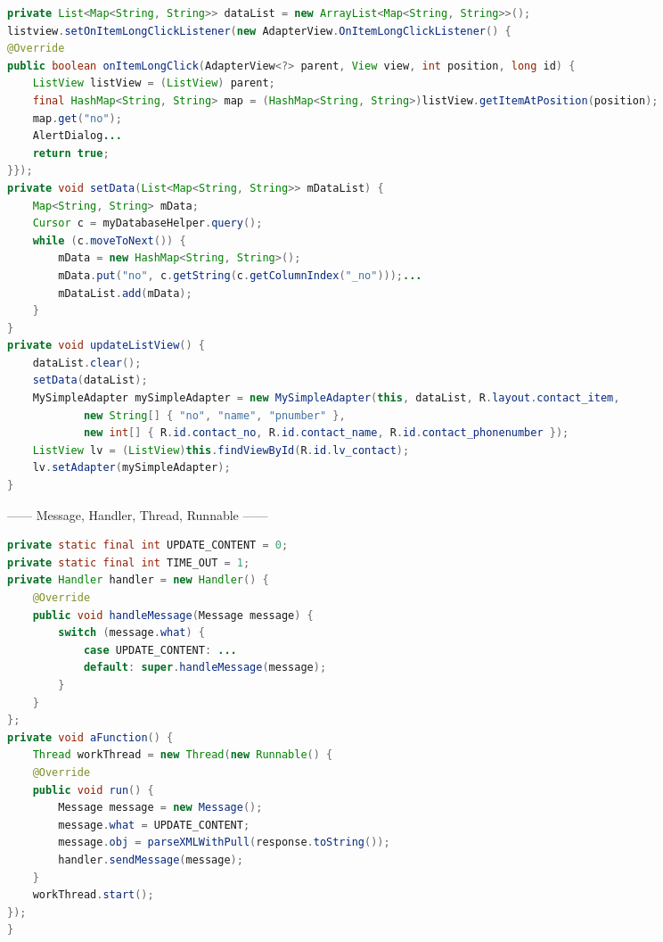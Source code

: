 \documentclass[10pt,a4paper,twocolumn]{report}
\begin{document}
\begin{CJK}{UTF8}{Courier New}
\begin{lstlisting}[language=Java]
private List<Map<String, String>> dataList = new ArrayList<Map<String, String>>();
listview.setOnItemLongClickListener(new AdapterView.OnItemLongClickListener() {
@Override
public boolean onItemLongClick(AdapterView<?> parent, View view, int position, long id) {
	ListView listView = (ListView) parent;
	final HashMap<String, String> map = (HashMap<String, String>)listView.getItemAtPosition(position);
	map.get("no");
	AlertDialog...
	return true;
}});
private void setData(List<Map<String, String>> mDataList) {
	Map<String, String> mData;
	Cursor c = myDatabaseHelper.query();
	while (c.moveToNext()) {
		mData = new HashMap<String, String>();
		mData.put("no", c.getString(c.getColumnIndex("_no")));...
		mDataList.add(mData);
	}
}
private void updateListView() {
	dataList.clear();
	setData(dataList);
	MySimpleAdapter mySimpleAdapter = new MySimpleAdapter(this, dataList, R.layout.contact_item,
			new String[] { "no", "name", "pnumber" },
			new int[] { R.id.contact_no, R.id.contact_name, R.id.contact_phonenumber });
	ListView lv = (ListView)this.findViewById(R.id.lv_contact);
	lv.setAdapter(mySimpleAdapter);
}
\end{lstlisting}

------ Message, Handler, Thread, Runnable ------
\begin{lstlisting}[language=Java]
private static final int UPDATE_CONTENT = 0;
private static final int TIME_OUT = 1;
private Handler handler = new Handler() {
	@Override
	public void handleMessage(Message message) {
		switch (message.what) {
			case UPDATE_CONTENT: ...
			default: super.handleMessage(message);
		}
	}
};
private void aFunction() {
	Thread workThread = new Thread(new Runnable() {
	@Override
	public void run() {
		Message message = new Message();
		message.what = UPDATE_CONTENT;
		message.obj = parseXMLWithPull(response.toString());
		handler.sendMessage(message);
	}
	workThread.start();
});
}
\end{lstlisting}


\end{CJK}
\end{document}
